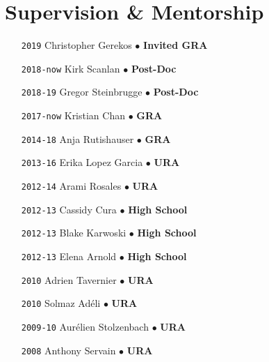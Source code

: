 \section*{Supervision \& Mentorship}

\begin{itemize}[leftmargin=5.8em, labelsep=1.5em]
\setlength\itemsep{-.5em}
    \item[\texttt{2019}] Christopher Gerekos $\bullet$ \textbf{Invited GRA}
    \item[\texttt{2018-now}] Kirk Scanlan $\bullet$ \textbf{Post-Doc}
    \item[\texttt{2018-19}] Gregor Steinbrugge $\bullet$ \textbf{Post-Doc}
    \item[\texttt{2017-now}] Kristian Chan $\bullet$ \textbf{GRA}
    \item[\texttt{2014-18}] Anja Rutishauser $\bullet$ \textbf{GRA}
    \item[\texttt{2013-16}] Erika Lopez Garcia $\bullet$ \textbf{URA}
    \item[\texttt{2012-14}] Arami Rosales $\bullet$ \textbf{URA}
    \item[\texttt{2012-13}] Cassidy Cura $\bullet$ \textbf{High School}
    \item[\texttt{2012-13}] Blake Karwoski $\bullet$ \textbf{High School}
    \item[\texttt{2012-13}] Elena Arnold $\bullet$ \textbf{High School}
    \item[\texttt{2010}] Adrien Tavernier $\bullet$ \textbf{URA}
    \item[\texttt{2010}] Solmaz Adéli $\bullet$ \textbf{URA}
    \item[\texttt{2009-10}] Aurélien Stolzenbach $\bullet$ \textbf{URA}
    \item[\texttt{2008}] Anthony Servain $\bullet$ \textbf{URA}
\end{itemize}
